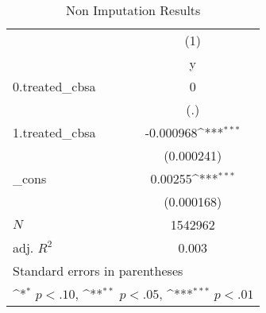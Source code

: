 \begin{table}[htbp]\centering
\def\sym#1{\ifmmode^{#1}\else\(^{#1}\)\fi}
\caption{Non Imputation Results}
\begin{tabular}{l*{1}{c}}
\hline\hline
            &\multicolumn{1}{c}{(1)}\\
            &\multicolumn{1}{c}{y}\\
\hline
0.treated\_cbsa&           0         \\
            &         (.)         \\
[1em]
1.treated\_cbsa&   -0.000968\sym{***}\\
            &  (0.000241)         \\
[1em]
\_cons      &     0.00255\sym{***}\\
            &  (0.000168)         \\
\hline
\(N\)       &     1542962         \\
adj. \(R^{2}\)&       0.003         \\
\hline\hline
\multicolumn{2}{l}{\footnotesize Standard errors in parentheses}\\
\multicolumn{2}{l}{\footnotesize \sym{*} \(p<.10\), \sym{**} \(p<.05\), \sym{***} \(p<.01\)}\\
\end{tabular}
\end{table}
